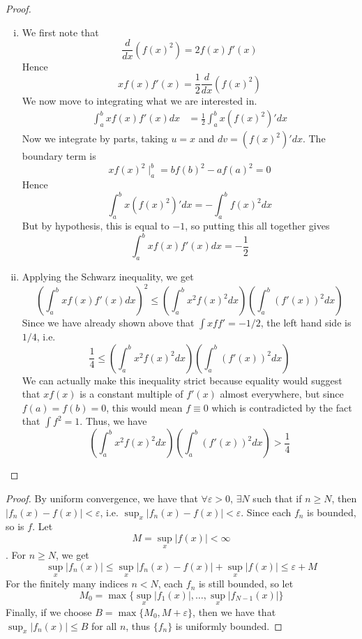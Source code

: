 \documentclass[11pt]{article}
\let\eps\varepsilon
\begin{document}
\begin{exercise}{6.15}
    \begin{proof}
        \begin{enumerate} [(i)]
            \item We first note that $$\frac{d}{dx} (f(x)^2) = 2 f(x) f'(x)$$ Hence $$xf(x)f'(x) = \frac{1}{2} \frac{d}{dx} (f(x)^2)$$ We now move to integrating what we are interested in. \begin{equation*}
            \begin{split}
                \int_a^b x f(x) f'(x) dx & = \frac{1}{2} \int_a^b x (f(x)^2)' dx
            \end{split}
        \end{equation*}
        Now we integrate by parts, taking $u = x$ and $dv = (f(x)^2)' dx$. The boundary term is $$xf(x)^2 \mid_{a}^b = bf(b)^2 - af(a)^2 = 0$$ Hence $$\int_a^b x(f(x)^2)'dx = - \int_a^b f(x)^2 dx$$ But by hypothesis, this is equal to $-1$, so putting this all together gives $$\int_a^b x f(x) f'(x) dx = -\frac{1}{2}$$
        \item Applying the Schwarz inequality, we get $$\left( \int_a^b xf(x) f'(x) dx \right)^2 \le \left( \int_a^b x^2 f(x)^2 dx \right) \left( \int_a^b (f'(x))^2 dx \right)$$ Since we have already shown above that $\int x f f' = -1/2$, the left hand side is $1/4$, i.e. $$\frac{1}{4} \le \left( \int_a^b x^2 f(x)^2 dx \right) \left( \int_a^b (f'(x))^2 dx \right)$$ We can actually make this inequality strict because equality would suggest that $xf(x)$ is a constant multiple of $f'(x)$ almost everywhere, but since $f(a) = f(b) = 0$, this would mean $f \equiv 0$ which is contradicted by the fact that $\int f^2 = 1$. Thus, we have $$\left( \int_a^b x^2 f(x)^2 dx \right) \left( \int_a^b (f'(x))^2 dx \right) > \frac{1}{4}$$
        \end{enumerate}
    \end{proof}
\end{exercise}

\begin{exercise}{7.1}
    \begin{proof}
        By uniform convergence, we have that $\forall \eps > 0$, $\exists N$ such that if $n \ge N$, then $|f_n(x) - f(x)| < \eps$, i.e. $\displaystyle \sup_x |f_n(x) - f(x) | < \eps$. Since each $f_n$ is bounded, so is $f$. Let $$\displaystyle M = \sup_x |f(x)| < \infty$$. For $n \ge N$, we get $$\sup_x |f_n(x)| \le \sup_x |f_n(x) - f(x)| + \sup_x |f(x)| \le \eps + M$$ For the finitely many indices $n < N$, each $f_n$ is still bounded, so let $$M_0 = \max\{ \sup_x |f_1(x)|, \dots, \sup_x |f_{N - 1}(x)| \}$$ Finally, if we choose $B = \max\{ M_0, M + \eps \}$, then we have that $\sup_x |f_n(x)| \le B$ for all $n$, thus $\{ f_n \}$ is uniformly bounded. 
    \end{proof}
\end{exercise}
\end{document}

